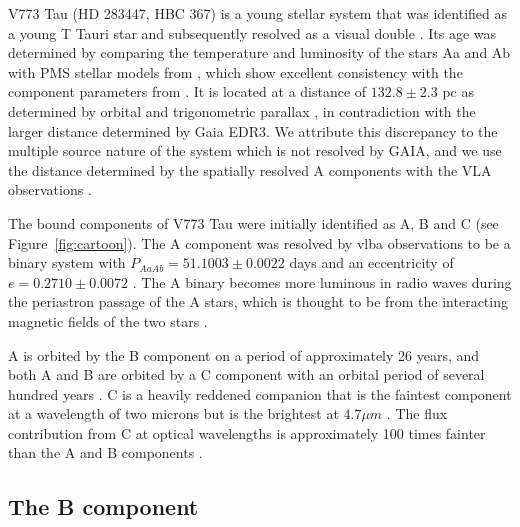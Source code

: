 \documentclass{aa}
\begin{document}
V773 Tau (HD 283447, HBC 367) is a young \citep[$3\pm1$ Myr;][]{Boden07} stellar system that was identified as a young T Tauri star \citep{Rydgren76} and subsequently resolved as a visual double \citep{Ghez93,Leinert93}.
%
Its age was determined by comparing the temperature and luminosity of the stars Aa and Ab with PMS stellar models from \citet{Montalban06}, which show excellent consistency with the component parameters from \citet{Boden07}.
%
It is located at a distance of $132.8\pm 2.3 $ pc as determined by orbital and trigonometric parallax \citep{Torres12}, in contradiction with the larger distance determined by Gaia EDR3.
%
We attribute this discrepancy to the multiple source nature of the system which is not resolved by GAIA, and we use the distance determined by the spatially resolved A components with the VLA observations \citep{Torres12}.

The bound components of V773 Tau were initially identified as A, B and C (see Figure~\ref{fig:cartoon}).
%
The A component was resolved by \ac{vlba} observations to be a binary system with $P_{AaAb}=51.1003\pm 0.0022$ days and an eccentricity of $e=0.2710\pm 0.0072$ \citep{Torres12}.
%
The A binary becomes more luminous in radio waves during the periastron passage of the A stars, which is thought to be from the interacting magnetic fields of the two stars \citep{Torres12}.

A is orbited by the B component on a period of approximately 26 years, and both A and B are orbited by a C component with an orbital period of several hundred years \citep{Duchene03}.
%
C is a heavily reddened companion that is the faintest component at a wavelength of two microns but is the brightest at $4.7\mu m$ \citep{Duchene03,Woitas03}.
%
The flux contribution from C at optical wavelengths is approximately 100 times fainter than the A and B components \citep{Duchene03}.

\subsection{The B component}
\end{document}
